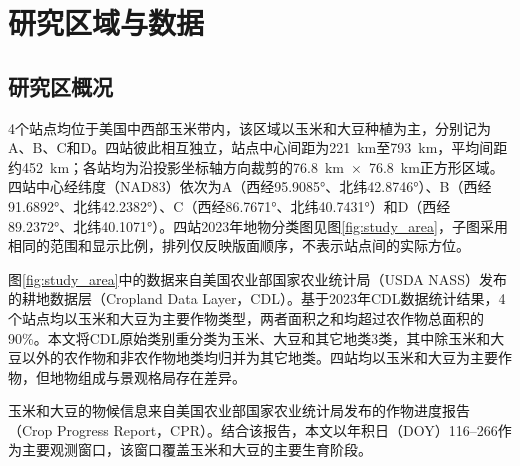 
\section{研究区域与数据}

\subsection{研究区概况}

4个站点均位于美国中西部玉米带内，该区域以玉米和大豆种植为主，分别记为A、B、C和D。四站彼此相互独立，站点中心间距为221~km至793~km，平均间距约452~km；各站均为沿投影坐标轴方向裁剪的76.8~km~$\times$~76.8~km正方形区域。四站中心经纬度（NAD83）依次为A（西经95.9085°、北纬42.8746°）、B（西经91.6892°、北纬42.2382°）、C（西经86.7671°、北纬40.7431°）和D（西经89.2372°、北纬40.1071°）。四站2023年地物分类图见图\ref{fig:study_area}，子图采用相同的范围和显示比例，排列仅反映版面顺序，不表示站点间的实际方位。

图\ref{fig:study_area}中的数据来自美国农业部国家农业统计局（USDA NASS）发布的耕地数据层（Cropland Data Layer，CDL）。基于2023年CDL数据统计结果，4个站点均以玉米和大豆为主要作物类型，两者面积之和均超过农作物总面积的90\%。本文将CDL原始类别重分类为玉米、大豆和其它地类3类，其中除玉米和大豆以外的农作物和非农作物地类均归并为其它地类。四站均以玉米和大豆为主要作物，但地物组成与景观格局存在差异。

玉米和大豆的物候信息来自美国农业部国家农业统计局发布的作物进度报告（Crop Progress Report，CPR）。结合该报告，本文以年积日（DOY）116–266作为主要观测窗口，该窗口覆盖玉米和大豆的主要生育阶段。


